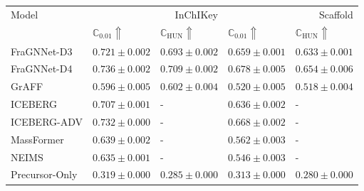 \begin{tabular}{lllll}
\toprule
Model & \multicolumn{2}{r}{InChIKey} & \multicolumn{2}{r}{Scaffold} \\
 & $\mathbb{C}_{0.01} \Uparrow$ & $\mathbb{C}_\text{HUN} \Uparrow$ & $\mathbb{C}_{0.01} \Uparrow$ & $\mathbb{C}_\text{HUN} \Uparrow$ \\
\midrule
FraGNNet-D3 & $0.721 \pm 0.002$ & $0.693 \pm 0.002$ & $0.659 \pm 0.001$ & $0.633 \pm 0.001$ \\
FraGNNet-D4 & $0.736 \pm 0.002$ & $0.709 \pm 0.002$ & $0.678 \pm 0.005$ & $0.654 \pm 0.006$ \\
GrAFF & $0.596 \pm 0.005$ & $0.602 \pm 0.004$ & $0.520 \pm 0.005$ & $0.518 \pm 0.004$ \\
ICEBERG & $0.707 \pm 0.001$ & - & $0.636 \pm 0.002$ & - \\
ICEBERG-ADV & $0.732 \pm 0.000$ & - & $0.668 \pm 0.002$ & - \\
MassFormer & $0.639 \pm 0.002$ & - & $0.562 \pm 0.003$ & - \\
NEIMS & $0.635 \pm 0.001$ & - & $0.546 \pm 0.003$ & - \\
Precursor-Only & $0.319 \pm 0.000$ & $0.285 \pm 0.000$ & $0.313 \pm 0.000$ & $0.280 \pm 0.000$ \\
\bottomrule
\end{tabular}
